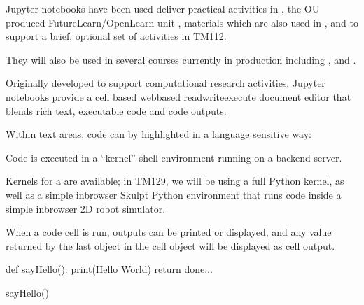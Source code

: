 \documentclass[letterpaper,10pt,english]{sphinxmanual}
\begin{document}
Jupyter notebooks have been used deliver practical activities in , the OU produced FutureLearn/OpenLearn unit , materials which are also used in , and to support a brief, optional set of activities in TM112.

They will also be used in several courses currently in production including ,  and .

Originally developed to support computational research activities, Jupyter notebooks provide a cell based web\sphinxhyphen{}based read\sphinxhyphen{}write\sphinxhyphen{}execute document editor that blends rich text, executable code and code outputs.

Within text areas, code can by highlighted in a language sensitive way:

\begin{sphinxVerbatim}[commandchars=\\\{\}]
 
\end{sphinxVerbatim}

Code is executed in a “kernel” shell environment running on a backend server.

Kernels for a  are available; in TM129, we will be using a full Python kernel, as well as a simple in\sphinxhyphen{}browser Skulpt Python environment that runs code inside a simple in\sphinxhyphen{}browser 2D robot simulator.

When a code cell is run, outputs can be printed or displayed, and any value returned by the last object in the cell object will be displayed as cell output.

{
\begin{sphinxVerbatim}[commandchars=\\\{\}]
\llap{\color{nbsphinxin}[ ]:\,\hspace{\fboxrule}\hspace{\fboxsep}}def sayHello():
    print(\PYGZsq{}Hello World\PYGZsq{})
    return \PYGZdq{}done...\PYGZdq{}

sayHello()
\end{sphinxVerbatim}
}
\end{document}
